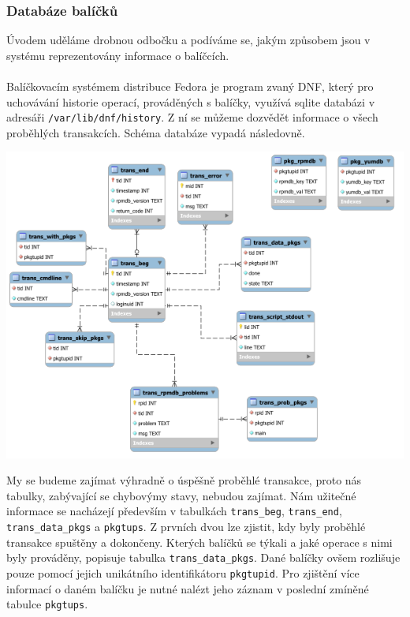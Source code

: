 \documentclass[
  field=inf,
  biblatex,
  glossaries,
  index
]{kidiplom}
\begin{document}
		\subsubsection{Databáze balíčků}
		Úvodem uděláme drobnou odbočku a podíváme se, jakým způsobem jsou v systému reprezentovány informace o balíčcích.
		\\
		\\
		Balíčkovacím systémem distribuce Fedora je program zvaný DNF\@, který pro uchovávání historie operací, prováděných s balíčky, využívá sqlite databázi v adresáři \texttt{/var/lib/dnf/history}. Z ní se můžeme dozvědět informace o všech proběhlých transakcích. Schéma databáze vypadá následovně.

		\centerline{\includegraphics[scale=0.67]{images/dnf-database.png}}

		My se budeme zajímat výhradně o úspěšně proběhlé transakce, proto nás tabulky, zabývající se chybovýmy stavy, nebudou zajímat. Nám užitečné informace se nacházejí především v tabulkách \texttt{trans\_beg}, \texttt{trans\_end}, \texttt{trans\_data\_pkgs} a \texttt{pkgtups}. Z prvních dvou lze zjistit, kdy byly proběhlé transakce spuštěny a dokončeny. Kterých balíčků se týkali a jaké operace s nimi byly prováděny, popisuje tabulka \texttt{trans\_data\_pkgs}. Dané balíčky ovšem rozlišuje pouze pomocí jejich unikátního identifikátoru \texttt{pkgtupid}. Pro zjištění více informací o daném balíčku je nutné nalézt jeho záznam v poslední zmíněné tabulce \texttt{pkgtups}.
\end{document}
